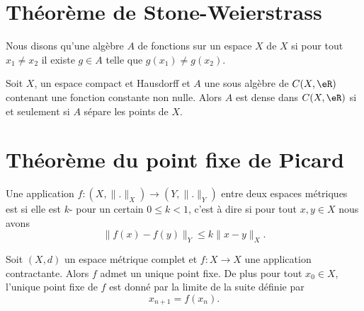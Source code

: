 \section{Théorème de Stone-Weierstrass}

\begin{definition}
    Nous disons qu'une algèbre \( A\) de fonctions sur un espace \( X\)  de \( X\) si pour tout \( x_1\neq x_2\) il existe \( g\in A\) telle que \( g(x_1)\neq g(x_2)\).
\end{definition}


\begin{theorem}\label{ThoWmAzSMF}
    Soit \( X\), un espace compact et Hausdorff et \( A\) une sous algèbre de \( C(X,\eR)\) contenant une fonction constante non nulle. Alors \( A\) est dense dans \( C(X,\eR)\) si et seulement si \( A\) sépare les points de \(X\).
\end{theorem}

\section{Théorème du point fixe de Picard}

\begin{definition}
    Une application \( f\colon (X,\| . \|_X)\to (Y,\| . \|_Y)\) entre deux espaces métriques est  si elle est \( k\)- pour un certain \( 0\leq k<1\), c'est à dire si pour tout \( x,y\in X\) nous avons
    \begin{equation}
        \| f(x)-f(y) \|_Y\leq k\| x-y \|_{X}.
    \end{equation}
\end{definition}

\begin{theorem}[Picard]     \label{ThoEPVkCL}
    Soit \( (X,d)\) un espace métrique complet et \( f\colon X\to X\) une application contractante. Alors \( f\) admet un unique point fixe. De plus pour tout \( x_0\in X\), l'unique point fixe de \( f\) est donné par la limite de la suite définie par
    \begin{equation}
        x_{n+1}=f(x_n).
    \end{equation}
\end{theorem}

